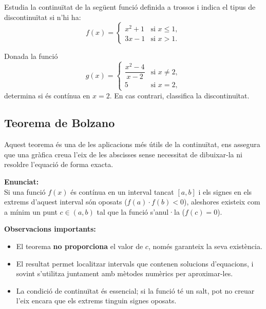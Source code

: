 \documentclass[12pt]{article}
\begin{document}
\begin{exercici}
Estudia la continuïtat de la següent funció definida a trossos i indica el tipus de discontinuïtat si n'hi ha:
\[
f(x) = \begin{cases} 
      x^2 + 1 & \text{si } x \leq 1, \\
      3x - 1 & \text{si } x > 1.
   \end{cases}
\]
\end{exercici}

\begin{exercici}
Donada la funció
\[
g(x) = \begin{cases}
      \dfrac{x^2-4}{x-2} & \text{si } x \neq 2, \\
      5 & \text{si } x = 2,
   \end{cases}
\]
determina si és contínua en $x=2$. En cas contrari, classifica la discontinuïtat.
\end{exercici}

\subsection{Teorema de Bolzano}

\begin{concept}
Aquest teorema és una de les aplicacions més útils de la continuïtat, ens assegura que una gràfica creua l'eix de les abscisses sense necessitat de dibuixar-la ni resoldre l'equació de forma exacta.

\textbf{Enunciat:}\\
Si una funció $f(x)$ és contínua en un interval tancat $[a,b]$ i els signes en els extrems d'aquest interval són oposats ($f(a) \cdot f(b) < 0$), aleshores existeix com a mínim un punt $c \in (a,b)$ tal que la funció s'anul·la ($f(c)=0$).

\textbf{Observacions importants:}
\begin{itemize}
    \item El teorema \textbf{no proporciona} el valor de $c$, només garanteix la seva existència.
    \item El resultat permet localitzar intervals que contenen solucions d'equacions, i sovint s'utilitza juntament amb mètodes numèrics per aproximar-les.
    \item La condició de continuïtat és essencial; si la funció té un salt, pot no creuar l'eix encara que els extrems tinguin signes oposats.
\end{itemize}
\end{concept}
\end{document}
